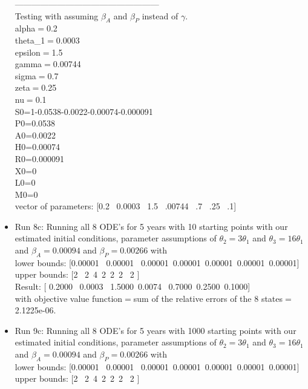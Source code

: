\documentclass[12pt]{article}
\begin{document}
\begin{itemize}
\pagebreak
--------------------------------------------------- \\
Testing with assuming $\beta_A$ and $\beta_P$ instead of $\gamma.$ \\
alpha$=$0.2 \\
theta\_{1}$=$0.0003 \\
epsilon$=$1.5 \\
gamma$=$0.00744\\
sigma$=$0.7 \\
zeta$=$0.25 \\
nu$=$0.1 \\

S0=1-0.0538-0.0022-0.00074-0.000091 \\
P0=0.0538 \\
A0=0.0022 \\
H0=0.00074 \\
R0=0.000091 \\
X0=0 \\
L0=0 \\
M0=0 \\

vector of parameters: [0.2 \ 0.0003 \ 1.5 \ .00744 \ .7 \ .25 \ .1]

\item Run 8c: Running all 8 ODE's for 5 years with 10 starting points with our estimated initial conditions, parameter assumptions of $\theta_2=3 \theta_1$ and $\theta_3=16\theta_1$ and $\beta_A=0.00094$ and $\beta_P=0.00266$ with \\
lower bounds: [0.00001  \ 0.00001 \ 0.00001\ 0.00001\ 0.00001\ 0.00001\ 0.00001] \\
upper bounds: [2 \ 2\  4\  2\  2\   2 \ 2 ] \\

Result: [  0.2000  \  0.0003  \  1.5000\    0.0074 \   0.7000\    0.2500\    0.1000]\\
with objective value function$=$sum of the relative errors of the 8 states$=$ 2.1225e-06. 



\item Run 9c: Running all 8 ODE's for 5 years with 1000 starting points with our estimated initial conditions, parameter assumptions of $\theta_2=3 \theta_1$ and $\theta_3=16\theta_1$ and $\beta_A=0.00094$ and $\beta_P=0.00266$ with \\
lower bounds: [0.00001  \ 0.00001 \ 0.00001\ 0.00001\ 0.00001\ 0.00001\ 0.00001] \\
upper bounds: [2 \ 2\  4\  2\  2\   2 \ 2 ] \\


\end{itemize}
\end{document}
